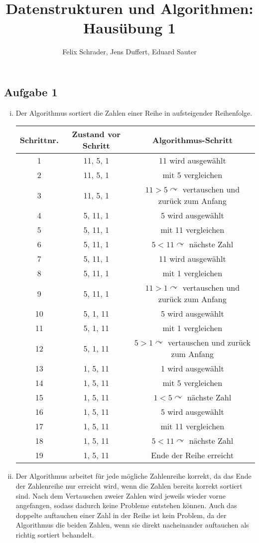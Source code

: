 \documentclass[11pt]{article}
\author{Felix Schrader, Jens Duffert, Eduard Sauter}
\title{Datenstrukturen und Algorithmen: Haus\"ubung 1}
\begin{document}
\subsection*{Aufgabe 1}
\begin{enumerate}[i)]

\item Der Algorithmus sortiert die Zahlen einer Reihe in aufsteigender Reihenfolge.

\begin{table}[h!]
\centering
\begin{tabular}{|c|c|c|}
\hline 
Schrittnr. & Zustand vor Schritt & Algorithmus-Schritt \\ 
\hline 
1 & 11, 5, 1 & 11 wird ausgew\"ahlt \\ 
\hline 
2 & 11, 5, 1 & mit 5 vergleichen \\ 
\hline 
3 & 11, 5, 1 & $11>5\curvearrowright$ vertauschen und zur\"uck zum Anfang \\ 
\hline 
4 & 5, 11, 1 & 5 wird ausgew\"ahlt \\ 
\hline 
5 & 5, 11, 1 & mit 11 vergleichen \\ 
\hline 
6 & 5, 11, 1 & $5<11\curvearrowright$ n\"achste Zahl \\ 
\hline 
7 & 5, 11, 1 & 11 wird ausgew\"ahlt \\ 
\hline 
8 & 5, 11, 1 & mit 1 vergleichen \\ 
\hline 
9 & 5, 11, 1 & $11>1\curvearrowright$ vertauschen und zur\"uck zum Anfang \\ 
\hline 
10 & 5, 1, 11 & 5 wird ausgew\"ahlt \\ 
\hline 
11 & 5, 1, 11 & mit 1 vergleichen \\ 
\hline 
12 & 5, 1, 11 & $5>1\curvearrowright$ vertauschen und zur\"uck zum Anfang \\ 
\hline 
13 & 1, 5, 11 & 1 wird ausgew\"ahlt \\ 
\hline 
14 & 1, 5, 11 & mit 5 vergleichen \\ 
\hline 
15 & 1, 5, 11 & $1<5\curvearrowright$ n\"achste Zahl \\ 
\hline 
16 & 1, 5, 11 & 5 wird ausgew\"ahlt \\ 
\hline 
17 & 1, 5, 11 & mit 11 vergleichen \\ 
\hline 
18 & 1, 5, 11 & $5<11\curvearrowright$ n\"achste Zahl \\ 
\hline 
19 & 1, 5, 11 & Ende der Reihe erreicht \\ 
\hline 
\end{tabular} 
\end{table}

\item Der Algorithmus arbeitet f\"ur jede m\"ogliche Zahlenreihe korrekt, da das Ende der Zahlenreihe nur erreicht wird, wenn die Zahlen bereits korrekt sortiert sind. Nach dem Vertauschen zweier Zahlen wird jeweils wieder vorne angefangen, sodass dadurch keine Probleme entstehen k\"onnen. Auch das doppelte auftauchen einer Zahl in der Reihe ist kein Problem, da der Algorithmus die beiden Zahlen, wenn sie direkt nacheinander auftauchen als richtig sortiert behandelt.
\end{enumerate}
\end{document}
